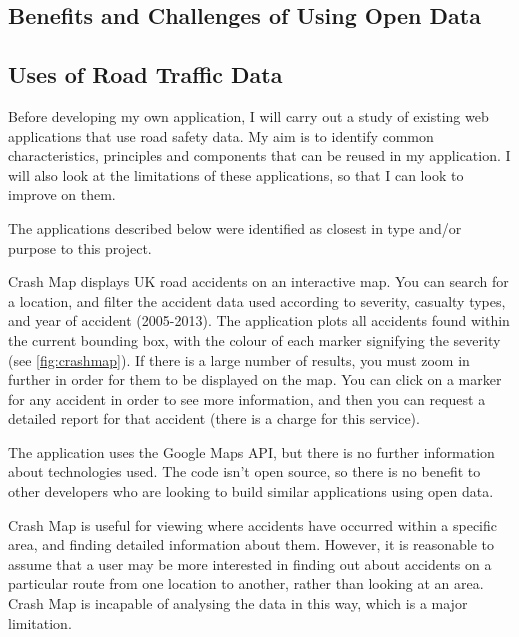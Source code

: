 \documentclass[authoryearcitations]{UoYCSproject}
\begin{document}
\subsection{Benefits and Challenges of Using Open Data}




\subsection{Uses of Road Traffic Data}

Before developing my own application, I will carry out a study of existing web applications that use road safety data. My aim is to identify common characteristics, principles and components that can be reused in my application. I will also look at the limitations of these applications, so that I can look to improve on them.

The applications described below were identified as closest in type and/or purpose to this project.
 
Crash Map \citep{crashmap} displays UK road accidents on an interactive map. You can search for a location, and filter the accident data used according to severity, casualty types, and year of accident (2005-2013). The application plots all accidents found within the current bounding box, with the colour of each marker signifying the severity (see \autoref{fig:crashmap}). If there is a large number of results, you must zoom in further in order for them to be displayed on the map. You can click on a marker for any accident in order to see more information, and then you can request a detailed report for that accident (there is a charge for this service).

The application uses the Google Maps API, but there is no further information about technologies used. The code isn't open source, so there is no benefit to other developers who are looking to build similar applications using open data. 

Crash Map is useful for viewing where accidents have occurred within a specific area, and finding detailed information about them. However, it is reasonable to assume that a user may be more interested in finding out about accidents on a particular route from one location to another, rather than looking at an area. Crash Map is incapable of analysing the data in this way, which is a major limitation.
\end{document}
